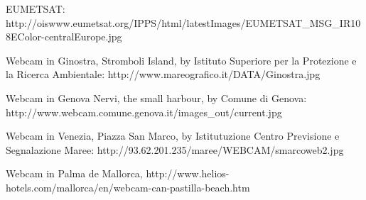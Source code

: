 \documentclass[a4paper]{article}
\renewcommand{\\}{\ {\large\textperiodcentered}\ }
\renewcommand{\\}{\ {\large\textperiodcentered}\ }
\begin{document}
EUMETSAT: http://oiswww.eumetsat.org/IPPS/html/latestImages/EUMETSAT\_MSG\_IR108EColor-centralEurope.jpg

Webcam in Ginostra, Stromboli Island, by Istituto Superiore per la Protezione e la Ricerca Ambientale: http://www.mareografico.it/DATA/Ginostra.jpg

Webcam in Genova Nervi, the small harbour, by Comune di Genova: http://www.webcam.comune.genova.it/images\_out/current.jpg

Webcam in Venezia, Piazza San Marco, by Istitutuzione Centro Previsione e Segnalazione Maree: http://93.62.201.235/maree/WEBCAM/smarcoweb2.jpg

Webcam in Palma de Mallorca, http://www.helios-hotels.com/mallorca/en/webcam-can-pastilla-beach.htm
\end{document}
